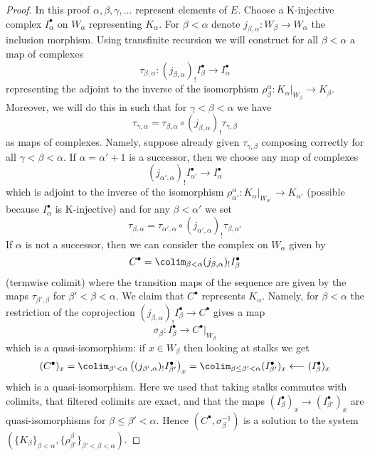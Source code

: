 \begin{proof}
In this proof $\alpha, \beta, \gamma, \ldots$ represent elements of $E$.
Choose a K-injective complex
$I_\alpha^\bullet$ on $W_\alpha$ representing $K_\alpha$.
For $\beta < \alpha$ denote $j_{\beta, \alpha} : W_\beta \to W_\alpha$
the inclusion morphism. Using transfinite recursion we will construct for all
$\beta < \alpha$ a map of complexes
$$
\tau_{\beta, \alpha} :
(j_{\beta, \alpha})_!I_\beta^\bullet
\longrightarrow
I_\alpha^\bullet
$$
representing the adjoint to the inverse of the isomorphism
$\rho^\alpha_\beta : K_\alpha|_{W_\beta} \to K_\beta$.
Moreover, we will do this in such that for
$\gamma < \beta < \alpha$ we have
$$
\tau_{\gamma, \alpha} = \tau_{\beta, \alpha} \circ
(j_{\beta, \alpha})_!\tau_{\gamma, \beta}
$$
as maps of complexes. Namely, suppose already given $\tau_{\gamma, \beta}$
composing correctly for all $\gamma < \beta < \alpha$.
If $\alpha = \alpha' + 1$ is a successor, then we choose any map of complexes
$$
(j_{\alpha', \alpha})_!I_{\alpha'}^\bullet \to I_\alpha^\bullet
$$
which is adjoint to the inverse of the isomorphism
$\rho^\alpha_{\alpha'} : K_\alpha|_{W_{\alpha'}} \to K_{\alpha'}$
(possible because $I_\alpha^\bullet$ is K-injective)
and for any $\beta < \alpha'$ we set
$$
\tau_{\beta, \alpha} = \tau_{\alpha', \alpha} \circ
(j_{\alpha', \alpha})_!\tau_{\beta, \alpha'}
$$
If $\alpha$ is not a successor, then
we can consider the complex on $W_\alpha$ given by
$$
C^\bullet = \colim_{\beta < \alpha} (j_{\beta, \alpha})_!I_\beta^\bullet
$$
(termwise colimit) where the transition maps of the sequence
are given by the maps $\tau_{\beta', \beta}$ for
$\beta' < \beta < \alpha$. We claim that $C^\bullet$
represents $K_\alpha$. Namely, for $\beta < \alpha$ the restriction
of the coprojection $(j_{\beta, \alpha})_!I_\beta^\bullet \to C^\bullet$
gives a map
$$
\sigma_\beta : I_\beta^\bullet \longrightarrow C^\bullet|_{W_\beta}
$$
which is a quasi-isomorphism: if $x \in W_\beta$ then looking
at stalks we get
$$
(C^\bullet)_x =
\colim_{\beta' < \alpha}
\left((j_{\beta', \alpha})_!I_{\beta'}^\bullet\right)_x =
\colim_{\beta \leq \beta' < \alpha} (I_{\beta'}^\bullet)_x
\longleftarrow
(I_\beta^\bullet)_x
$$
which is a quasi-isomorphism. Here we used that taking stalks
commutes with colimits, that filtered colimits are exact, and
that the maps $(I_\beta^\bullet)_x \to (I_{\beta'}^\bullet)_x$
are quasi-isomorphisms for $\beta \leq \beta' < \alpha$.
Hence $(C^\bullet, \sigma_\beta^{-1})$ is a solution to the
system $(\{K_\beta\}_{\beta < \alpha},
\{\rho^\beta_{\beta'}\}_{\beta' < \beta < \alpha})$.

\end{proof}
